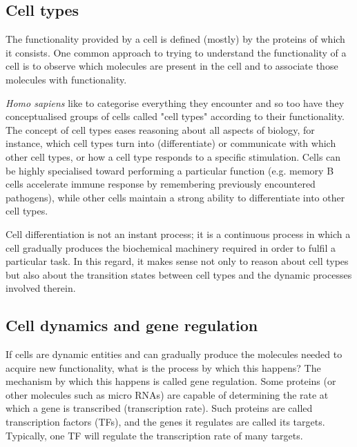 \subsection{Cell types}
The functionality provided by a cell is defined (mostly) by the proteins of which it consists. One common approach to trying to understand the functionality of a cell is to observe which molecules are present in the cell and to associate those molecules with functionality. 

\textit{Homo sapiens} like to categorise everything they encounter and so too have they conceptualised groups of cells called "cell types" according to their functionality. The concept of cell types eases reasoning about all aspects of biology, for instance, which cell types turn into (differentiate) or communicate with which other cell types, or how a cell type responds to a specific stimulation. Cells can be highly specialised toward performing a particular function (e.g. memory B cells accelerate immune response by remembering previously encountered pathogens), while other cells maintain a strong ability to differentiate into other cell types. 

Cell differentiation is not an instant process; it is a continuous process in which a cell gradually produces the biochemical machinery required in order to fulfil a particular task. In this regard, it makes sense not only to reason about cell types but also about the transition states between cell types and the dynamic processes involved therein.

\subsection{Cell dynamics and gene regulation}
If cells are dynamic entities and can gradually produce the molecules needed to acquire new functionality, what is the process by which this happens? The mechanism by which this happens is called gene regulation. Some proteins (or other molecules such as micro RNAs) are capable of determining the rate at which a gene is transcribed (transcription rate). Such proteins are called transcription factors (TFs), and the genes it regulates are called its targets. Typically, one TF will regulate the transcription rate of many targets. %

